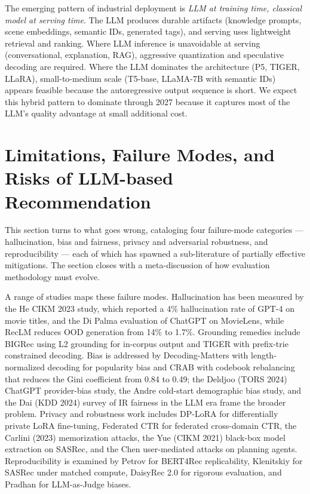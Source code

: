 \documentclass{article}
\begin{document}
The emerging pattern of industrial deployment is \emph{LLM at training time, classical model at serving time}. The LLM produces durable artifacts (knowledge prompts, scene embeddings, semantic IDs, generated tags), and serving uses lightweight retrieval and ranking. Where LLM inference is unavoidable at serving (conversational, explanation, RAG), aggressive quantization and speculative decoding are required. Where the LLM dominates the architecture (P5, TIGER, LLaRA), small-to-medium scale (T5-base, LLaMA-7B with semantic IDs) appears feasible because the autoregressive output sequence is short. We expect this hybrid pattern to dominate through 2027 because it captures most of the LLM's quality advantage at small additional cost.

\section{Limitations, Failure Modes, and Risks of LLM-based Recommendation}\label{limitations-failure-modes-and-risks-of-llm-based-recommendation}

This section turns to what goes wrong, cataloging four failure-mode categories --- hallucination, bias and fairness, privacy and adversarial robustness, and reproducibility --- each of which has spawned a sub-literature of partially effective mitigations. The section closes with a meta-discussion of how evaluation methodology must evolve.

A range of studies maps these failure modes. Hallucination has been measured by the He CIKM 2023 study, which reported a 4\% hallucination rate of GPT-4 on movie titles, and the Di Palma \citet{palma2023evaluatingchatgpta} evaluation of ChatGPT on MovieLens, while RecLM \citep{liao2025eliminatingoutofdo} reduces OOD generation from 14\% to 1.7\%. Grounding remedies include BIGRec \citep{bao2023arxiv2305004472023} using L2 grounding for in-corpus output and TIGER \citep{rajput2023recommendersystems} with prefix-trie constrained decoding. Bias is addressed by Decoding-Matters \citep{bao2024decodingmattersadd} with length-normalized decoding for popularity bias and CRAB \citep{fan2026crabcodebookrebala} with codebook rebalancing that reduces the Gini coefficient from 0.84 to 0.49; the Deldjoo (TORS 2024) ChatGPT provider-bias study, the Andre \citet{andre2025revealingpotential} cold-start demographic bias study, and the Dai (KDD 2024) survey of IR fairness in the LLM era frame the broader problem. Privacy and robustness work includes DP-LoRA \citep{yu2021differentiallypriv} for differentially private LoRA fine-tuning, Federated CTR \citep{qin2025federatedcrossdoma} for federated cross-domain CTR, the Carlini (2023) memorization attacks, the Yue (CIKM 2021) black-box model extraction on SASRec, and the Chen \citet{chen2026toohelpfultobesafe} user-mediated attacks on planning agents. Reproducibility is examined by Petrov \citet{petrov2022arxiv2207074832022} for BERT4Rec replicability, Klenitskiy \citet{klenitskiy2023arxiv230907602} for SASRec under matched compute, DaisyRec 2.0 \citep{sun2022daisyrec20benchmar} for rigorous evaluation, and Pradhan \citet{pradhan2025llmasajudgerapidev} for LLM-as-Judge biases.
\end{document}

